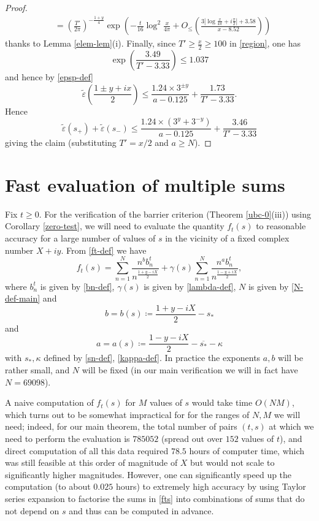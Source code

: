 \documentclass[a4paper,11pt,twoside]{amsart}
\newcommand\eps{\varepsilon}
\begin{document}
\begin{proof}
\begin{align*}
&= \left(\frac{T'}{2\pi}\right)^{-\frac{1+y}{4}} \exp\left( - \frac{t}{16} \log^2 \frac{x}{4\pi} + O_{\leq}\left( \frac{3 |\log \frac{x}{4\pi} + i \frac{\pi}{2}|+3.58}{x-8.52} \right) \right)
\end{align*}
thanks to Lemma \ref{elem-lem}(i).  Finally, since $T' \geq \frac{x}{2} \geq 100$ in \eqref{region}, one has 
$$\exp\left(\frac{3.49}{T'-3.33}\right) \leq 1.037$$
and hence by \eqref{epsp-def}
$$ 
\tilde \eps\left(\frac{1 \pm y+ix}{2}\right) \leq \frac{1.24 \times 3^{\pm y}}{a-0.125} + \frac{1.73}{T'-3.33}.$$
Hence
$$
\tilde \eps(s_+) + \tilde \eps(s_-) \leq \frac{1.24 \times (3^y+3^{-y})}{a-0.125} + \frac{3.46}{T'-3.33}$$
giving the claim (substituting $T' = x/2$ and $a \geq N$).
\end{proof}

\section{Fast evaluation of multiple sums}\label{multiple-sec}

Fix $t \geq 0$.  For the verification of the barrier criterion (Theorem \ref{ubc-0}(iii)) using Corollary \ref{zero-test}, we will need to evaluate the quantity $f_t(s)$ to reasonable accuracy for a large number of values of $s$ in the vicinity of a fixed complex number $X+iy$.  From \eqref{ft-def} we have
\begin{equation}\label{fts}
f_t(s) = \sum_{n=1}^N \frac{n^b b_n^t}{n^{\frac{1+y-iX}{2}}} + \gamma(s) \sum_{n=1}^N \frac{n^a b_n^t}{n^{\frac{1-y+iX}{2}}},
\end{equation}
where $b_n^t$ is given by \eqref{bn-def}, $\gamma(s)$ is given by \eqref{lambda-def}, $N$ is given by \eqref{N-def-main} and
$$ b = b(s) \coloneqq  \frac{1+y-iX}{2} - s_* $$
and
$$ a = a(s) \coloneqq  \frac{1-y-iX}{2} - \overline{s_*} - \kappa$$
with $s_*, \kappa$ defined by \eqref{sn-def}, \eqref{kappa-def}.  In practice the exponents $a,b$ will be rather small, and $N$ will be fixed (in our main verification we will in fact have $N = 69098$).

A naive computation of $f_t(s)$ for $M$ values of $s$ would take time $O(NM)$, which turns out to be somewhat impractical for for the ranges of $N,M$ we will need; indeed, for our main theorem, the total number of pairs $(t,s)$ at which we need to perform the evaluation is $785052$ (spread out over $152$ values of $t$), and direct computation of all this data required $78.5$ hours of computer time, which was still feasible at this order of magnitude of $X$ but would not scale to significantly higher magnitudes.  However, one can significantly speed up the computation (to about $0.025$ hours) to extremely high accuracy by using Taylor series expansion to factorise the sums in \eqref{fts} into combinations of sums that do not depend on $s$ and thus can be computed in advance.
\end{document}
